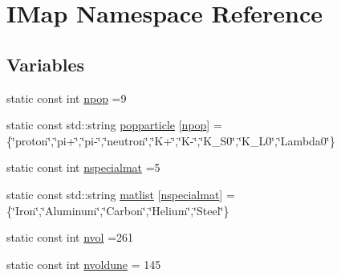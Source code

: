 \hypertarget{namespace_i_map}{\section{I\-Map Namespace Reference}
\label{namespace_i_map}
}
\subsection*{Variables}
\begin{DoxyCompactItemize}
\item 
static const int \hyperlink{namespace_i_map_a6d292207e9b2c50f87fe11ddf9a46b4f}{npop} =9
\item 
static const std\-::string \hyperlink{namespace_i_map_ae46c7923bde764e23980ee483272f229}{popparticle} \mbox{[}\hyperlink{namespace_i_map_a6d292207e9b2c50f87fe11ddf9a46b4f}{npop}\mbox{]} = \{\char`\"{}proton\char`\"{},\char`\"{}pi+\char`\"{},\char`\"{}pi-\/\char`\"{},\char`\"{}neutron\char`\"{},\char`\"{}K+\char`\"{},\char`\"{}K-\/\char`\"{},\char`\"{}K\-\_\-\-S0\char`\"{},\char`\"{}K\-\_\-\-L0\char`\"{},\char`\"{}Lambda0\char`\"{}\}
\item 
static const int \hyperlink{namespace_i_map_a7f2a143d764d8e7e548e79da73e4ad89}{nspecialmat} =5
\item 
static const std\-::string \hyperlink{namespace_i_map_a2ec15d749cb5eab8c8cc4fbfee0e9491}{matlist} \mbox{[}\hyperlink{namespace_i_map_a7f2a143d764d8e7e548e79da73e4ad89}{nspecialmat}\mbox{]} = \{\char`\"{}Iron\char`\"{},\char`\"{}Aluminum\char`\"{},\char`\"{}Carbon\char`\"{},\char`\"{}Helium\char`\"{},\char`\"{}Steel\char`\"{}\}
\item 
static const int \hyperlink{namespace_i_map_a9e84d12837376356ab193324552af029}{nvol} =261
\item 
static const int \hyperlink{namespace_i_map_a1c9b3e0953e2482ba19063292d111bb2}{nvoldune} = 145
\item 

\end{DoxyCompactItemize}
